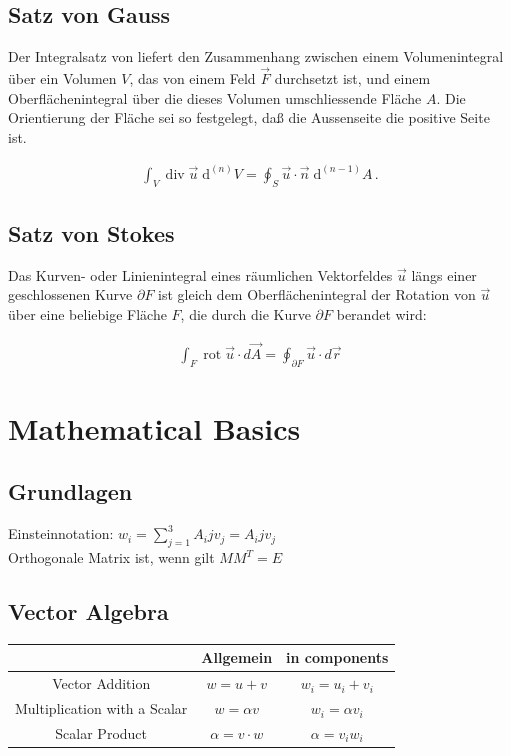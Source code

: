 \documentclass[a4paper]{scrartcl}
\begin{document}
\subsection{Satz von Gauss}
Der Integralsatz von  liefert den Zusammenhang zwischen einem Volumenintegral
über ein Volumen $V$, das von einem Feld $\vec F$ durchsetzt ist, und einem
Oberflächenintegral über die dieses Volumen umschliessende Fläche $A$. Die
Orientierung der Fläche sei so festgelegt, daß die Aussenseite die positive
Seite ist.

\begin{align}
\int_V \operatorname{div} \vec u \; \mathrm d^{(n)}V = \oint_{S} \vec u \cdot
\vec n\; \mathrm d^{(n-1)}A\,.
\end{align}
\subsection{Satz von Stokes}
Das Kurven- oder Linienintegral eines räumlichen Vektorfeldes $\vec u$ längs
einer geschlossenen Kurve $\partial F$ ist gleich dem Oberflächenintegral der
Rotation von $\vec u$ über eine beliebige Fläche $F$, die durch die Kurve
$\partial F$ berandet wird:

\begin{align}
 \int_{F} \operatorname{rot} \vec u \cdot d \vec A =
\oint_{\partial F} \vec u \cdot d \vec r
\end{align}


\section{Mathematical Basics}
\subsection{Grundlagen}


Einsteinnotation: $w_i=\sum_{j=1}^{3}A_ijv_j=A_ijv_j$
\\
Orthogonale Matrix ist, wenn gilt $MM^T=E$
\\


\subsection{Vector Algebra}
\begin{tabular}{|c|c|c|}
\hline  & Allgemein & in components \\ 
\hline Vector Addition & $w=u+v$ & $w_i=u_i+v_i$ \\ 
\hline Multiplication with a Scalar & $w=\alpha v$ & $w_i=\alpha v_i$ \\ 
\hline Scalar Product & $\alpha = v \cdot w $ & $\alpha = v_i w_i$ \\ 
\hline 
\end{tabular} 
\end{document}
